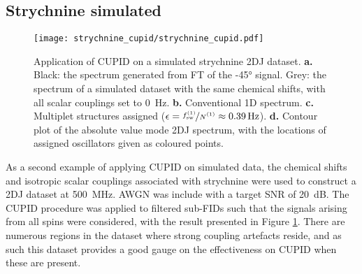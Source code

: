 
\subsection{Strychnine simulated}
\label{subsec:strychnine-cupid}
\begin{figure}
    \centering
    \texttt{[image: strychnine\_cupid/strychnine\_cupid.pdf]}
    \caption[
        Application of \acs{CUPID} on a simulated strychnine \acs{2DJ} dataset.
    ]
    {
        Application of \ac{CUPID} on a simulated strychnine \ac{2DJ} dataset.
        \textbf{a.} Black: the spectrum generated from \ac{FT} of the \ang{-45}
        signal. Grey: the spectrum of a simulated dataset with the same
        chemical shifts, with all scalar couplings set to \qty{0}{\hertz}.
        \textbf{b.} Conventional \ac{1D} spectrum.
        \textbf{c.} Multiplet structures assigned ($\epsilon =
        \nicefrac{\fswone}{\None} \approx \qty{0.39}{\hertz}$).
        \textbf{d.} Contour plot of the absolute value mode \ac{2DJ} spectrum,
        with the locations of assigned oscillators given as coloured points.
    }
    \label{fig:strychnine-cupid}
\end{figure}
As a second example of applying \ac{CUPID} on simulated data, the chemical
shifts and isotropic scalar couplings associated with strychnine
were used to construct a 2DJ dataset at \qty{500}{\mega\hertz}. \ac{AWGN} was
include with a target
\ac{SNR} of \qty{20}{\deci\bel}. The CUPID procedure was applied to filtered
sub-FIDs such that the signals arising from all spins were considered, with the
result presented in Figure \ref{fig:strychnine-cupid}. There are numerous
regions in the dataset where strong coupling artefacts reside, and as such this
dataset provides a good gauge on the effectiveness on \ac{CUPID} when these are
present.

